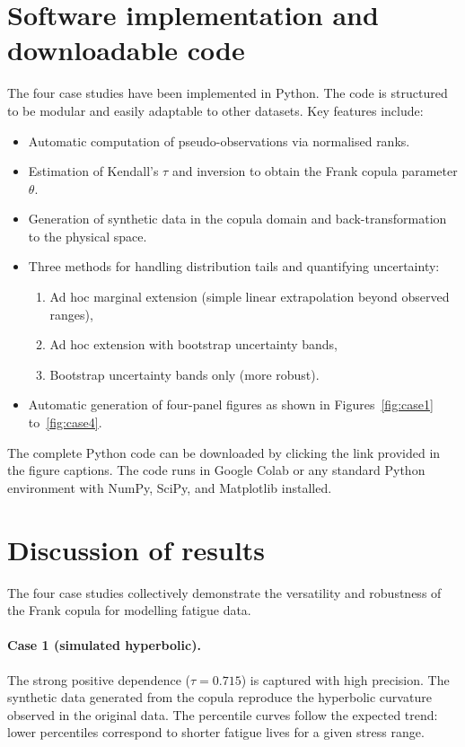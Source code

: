 \section{Software implementation and downloadable code}
\label{sec:software-implementation}

The four case studies have been implemented in Python. The code is structured to be modular and easily adaptable to other datasets. Key features include:

\begin{itemize}
    \item Automatic computation of pseudo-observations via normalised ranks.
    \item Estimation of Kendall's \(\tau\) and inversion to obtain the Frank copula parameter \(\theta\).
    \item Generation of synthetic data in the copula domain and back-transformation to the physical space.
    \item Three methods for handling distribution tails and quantifying uncertainty:
    \begin{enumerate}
        \item Ad hoc marginal extension (simple linear extrapolation beyond observed ranges),
        \item Ad hoc extension with bootstrap uncertainty bands,
        \item Bootstrap uncertainty bands only (more robust).
    \end{enumerate}
    \item Automatic generation of four-panel figures as shown in Figures~\ref{fig:case1} to~\ref{fig:case4}.
\end{itemize}

The complete Python code can be downloaded by clicking the link provided in the figure captions. The code runs in Google Colab or any standard Python environment with NumPy, SciPy, and Matplotlib installed.

\section{Discussion of results}
\label{sec:discussion-results}

The four case studies collectively demonstrate the versatility and robustness of the Frank copula for modelling fatigue data.

\paragraph{Case 1 (simulated hyperbolic).} The strong positive dependence (\(\tau = 0.715\)) is captured with high precision. The synthetic data generated from the copula reproduce the hyperbolic curvature observed in the original data. The percentile curves follow the expected trend: lower percentiles correspond to shorter fatigue lives for a given stress range.

